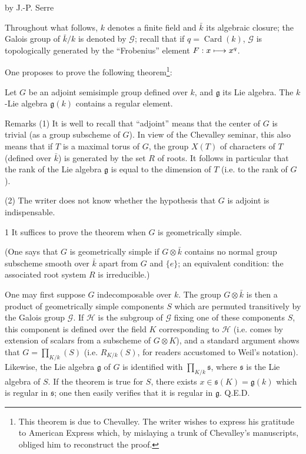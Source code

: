 \begin{center}by J.-P. Serre\end{center}
\setcounter{footnote}{0}
Throughout what follows, $k$ denotes a finite field and $\bar k$ its
algebraic closure; the Galois group of $\bar k/k$ is denoted by
$\mathscr G$; recall that if $q=\operatorname{Card}(k)$,
$\mathscr G$ is topologically generated by the ``Frobenius'' element
$F:x\longmapsto x^q$.

One proposes to prove the following theorem\footnote{This theorem
is due to Chevalley. The writer wishes to express his gratitude
to American Express which, by mislaying a trunk of Chevalley's
manuscripts, obliged him to reconstruct the proof.}:
\begin{theorem}{}\label{XIV.Appendix.Theorem}
Let $G$ be an adjoint semisimple group defined over $k$, and
$\mathfrak g$ its Lie algebra. The $k$-Lie algebra
$\mathfrak g(k)$ contains a regular element.
\end{theorem}
\begin{enoncerm}{Remarks}{}
(1) It is well to recall that ``adjoint'' means that the center
of $G$ is trivial (as a group subscheme of $G$). In view of the
Chevalley seminar, this also means that if $T$ is a maximal
torus of $G$, the group $X(T)$ of characters of $T$ (defined
over $\bar k$) is generated by the set $R$ of roots. It follows
in particular that the rank of the Lie algebra $\mathfrak g$
is equal to the dimension of $T$ (i.e. to the rank of $G$).

(2) The writer does not know whether the hypothesis that
$G$ is adjoint is indispensable.
\end{enoncerm}

\begin{lemma}{1}\label{XIV.1}
It suffices to prove the theorem when $G$ is geometrically simple.
\end{lemma}
(One says that $G$ is geometrically simple if $G\otimes\bar k$
contains no normal group subscheme smooth over $\bar k$ apart
from $G$ and $\{e\}$; an equivalent condition: the associated
root system $R$ is irreducible.)

One may first suppose $G$ indecomposable over $k$. The group
$G\otimes\bar k$ is then a product of geometrically simple
components $S$ which are permuted transitively by the Galois
group $\mathscr G$. If $\mathscr H$ is the subgroup of
$\mathscr G$ fixing one of these components $S$, this component
is defined over the field $K$ corresponding to $\mathscr H$
(i.e. comes by extension of scalars from a subscheme of
$G\otimes K$), and a standard argument shows that
$G=\prod_{K/k}(S)$ (i.e. $R_{K/k}(S)$, for readers accustomed
to Weil's notation). Likewise, the Lie algebra $\mathfrak g$
of $G$ is identified with $\prod_{K/k}\mathfrak s$, where
$\mathfrak s$ is the Lie algebra of $S$. If the theorem is
true for $S$, there exists $x\in\mathfrak s(K)=\mathfrak g(k)$
which is regular in $\mathfrak s$; one then easily verifies
that it is regular in $\mathfrak g$. \hfill Q.E.D.

